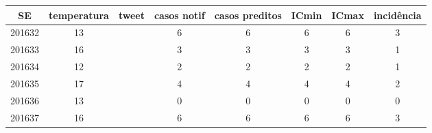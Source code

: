 \begin{tabular}{c|ccccccc}
  \hline
SE & temperatura & tweet & casos notif & casos preditos & ICmin & ICmax & incidência \\ 
  \hline
201632 & 13 &  & 6 & 6 & 6 & 6 & 3 \\ 
  201633 & 16 &  & 3 & 3 & 3 & 3 & 1 \\ 
  201634 & 12 &  & 2 & 2 & 2 & 2 & 1 \\ 
  201635 & 17 &  & 4 & 4 & 4 & 4 & 2 \\ 
  201636 & 13 &  & 0 & 0 & 0 & 0 & 0 \\ 
  201637 & 16 &  & 6 & 6 & 6 & 6 & 3 \\ 
   \hline
\end{tabular}
